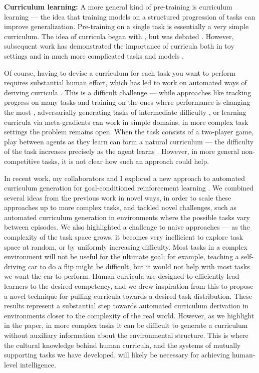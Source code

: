 \textbf{Curriculum learning:} A more general kind of pre-training is curriculum learning \citep{Bengio2009} --- the idea that training models on a structured progression of tasks can improve generalization. Pre-training on a single task is essentially a very simple curriculum. The idea of curricula began with \citet{Elman1993}, but was debated \citep[e.g.][]{Rohde1997}. However, subsequent work has demonstrated the importance of curricula both in toy settings \citep{Gulcehre2013} and in much more complicated tasks and models \citep[e.g.][]{Zaremba2014, Graves2016}. \par
Of course, having to devise a curriculum for each task you want to perform requires substantial human effort, which has led to work on automated ways of deriving curricula \citep{Graves2017}. This is a difficult challenge --- while approaches like tracking progress on many tasks and training on the ones where performance is changing the most \citep{Baranes2013}, adversarially generating tasks of intermediate difficulty \citep{Florensa2018}, or learning curricula via meta-gradients \citep{Such2019} can work in simple domains, in more complex task settings the problem remains open. When the task consists of a two-player game, play between agents as they learn can form a natural curriculum --- the difficulty of the task increases precisely as the agent learns \citep{Silver2017, Jaderberg2019}. However, in more general non-competitive tasks, it is not clear how such an approach could help. \par 
In recent work, my collaborators and I explored a new approach to automated curriculum generation for goal-conditioned reinforcement learning \citep{Racaniere2019}. We combined several ideas from the previous work in novel ways, in order to scale these approaches up to more complex tasks, and tackled novel challenges, such as automated curriculum generation in environments where the possible tasks vary between episodes. We also highlighted a challenge to naive approaches --- as the complexity of the task space grows, it becomes very inefficient to explore task space at random, or by uniformly increasing difficulty. Most tasks in a complex environment will not be useful for the ultimate goal; for example, teaching a self-driving car to do a flip might be difficult, but it would not help with most tasks we want the car to perform. Human curricula are designed to efficiently lead learners to the desired competency, and we drew inspiration from this to propose a novel technique for pulling curricula towards a desired task distribution. These results represent a substantial step towards automated curriculum derivation in environments closer to the complexity of the real world. However, as we highlight in the paper, in more complex tasks it can be difficult to generate a curriculum without auxiliary information about the environmental structure. This is where the cultural knowledge behind human curricula, and the systems of mutually supporting tasks we have developed, will likely be necessary for achieving human-level intelligence. \par 

